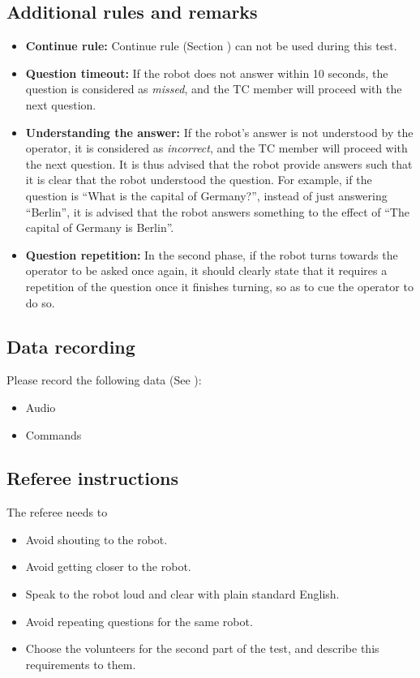 \subsection{Additional rules and remarks}

\begin{itemize}
\item \textbf{Continue rule:} Continue rule (Section ) can not be used during this test.
\item \textbf{Question timeout:} If the robot does not answer within 10 seconds, the question is considered as \textit{missed}, and the TC member will proceed with the next question.
\item \textbf{Understanding the answer:} If the robot's answer is not understood by the operator, it is considered as \textit{incorrect}, and the TC member will proceed with the next question. It is thus advised that the robot provide answers such that it is clear that the robot understood the question. For example, if the question is ``What is the capital of Germany?'', instead of just answering ``Berlin'', it is advised that the robot answers something to the effect of ``The capital of Germany is Berlin''.
\item \textbf{Question repetition:} In the second phase, if the robot turns towards the operator to be asked once again, it should clearly state that it requires a repetition of the question once it finishes turning, so as to cue the operator to do so.
\end{itemize}

\subsection{Data recording}
  Please record the following data (See ):
  \begin{itemize}
   \item Audio
   \item Commands
  \end{itemize}

\subsection{Referee instructions}

The referee needs to
\begin{itemize}
\item Avoid shouting to the robot.
\item Avoid getting closer to the robot.
\item Speak to the robot loud and clear with plain standard English.
\item Avoid repeating questions for the same robot.
\item Choose the volunteers for the second part of the test, and describe this requirements to them.
\end{itemize}

